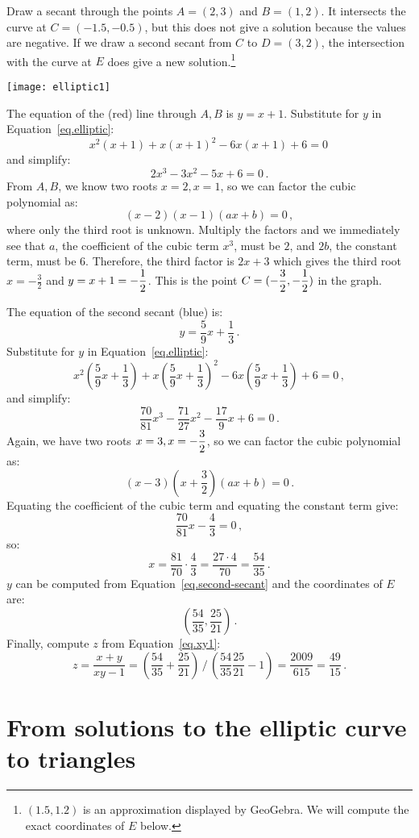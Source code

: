 Draw a secant through the points $A=(2,3)$ and $B=(1,2)$. It intersects the curve at $C=(-1.5,-0.5)$, but this does not give a solution because the values are negative. If we draw a second secant from $C$ to $D=(3,2)$, the intersection with the curve at $E$ does give a new solution.\footnote{$(1.5,1.2)$ is an approximation displayed by GeoGebra. We will compute the exact coordinates of $E$ below.}

\begin{center}
\texttt{[image: elliptic1]}
\end{center}

The equation of the (red) line through $A,B$ is $y=x+1$. Substitute for $y$ in Equation~\ref{eq.elliptic}:
\[
x^2(x+1) + x(x+1)^2 -6x(x+1) +6 =0\,
\]
and simplify:
\[
2x^3 -3x^2 -5x +6 =0\,.
\]
From $A,B$, we know two roots $x=2,x=1$, so we can factor the cubic polynomial as:
\[
(x-2)(x-1)(ax+b)=0\,,
\]
where only the third root is unknown. Multiply the factors and we immediately see that $a$, the coefficient of the cubic term $x^3$, must be $2$, and $2b$, the constant term, must be $6$. Therefore, the third factor is $2x+3$ which gives the third root $x=-\frac{3}{2}$ and $y=x+1=-\displaystyle\frac{1}{2}$. This is the point $C=(-\displaystyle\frac{3}{2},-\displaystyle\frac{1}{2})$ in the graph.

The equation of the second secant (blue) is:
\begin{equation}
y = \frac{5}{9}x + \frac{1}{3}\,.\label{eq.second-secant}
\end{equation}
Substitute for $y$ in Equation~\ref{eq.elliptic}:
\[
x^2\left(\frac{5}{9}x + \frac{1}{3}\right) + x\left(\frac{5}{9}x + \frac{1}{3}\right)^2 -6x\left(\frac{5}{9}x + \frac{1}{3}\right) +6 =0\,,
\]
and simplify:
\[
\frac{70}{81}x^3 - \frac{71}{27}x^2 - \frac{17}{9}x +6 =0\,.
\]
Again, we have two roots $x=3,x=-\displaystyle\frac{3}{2}$, so we can factor the cubic polynomial as:
\[
(x-3)(x+\frac{3}{2})(ax+b)=0\,.
\]
Equating the coefficient of the cubic term and equating the constant term give:
\[
\frac{70}{81}x - \frac{4}{3}=0\,,
\]
so:
\[
x=\frac{81}{70}\cdot \frac{4}{3}= \frac{27\cdot 4}{70} = \frac{54}{35}\,.
\]
$y$ can be computed from Equation~\ref{eq.second-secant} and the coordinates of $E$ are:
\[
\left(\frac{54}{35}, \frac{25}{21}\right)\,.
\]
Finally, compute $z$ from Equation~\ref{eq.xy1}:
\[
z=\frac{x+y}{xy-1}=%
\displaystyle\left(\frac{54}{35} + \frac{25}{21}\right)%
 \, / \,%
\displaystyle\left(\frac{54}{35}\frac{25}{21}-1\right)=%
\frac{2009}{615} = \frac{49}{15}\,.
\]

\section{From solutions to the elliptic curve to triangles}

